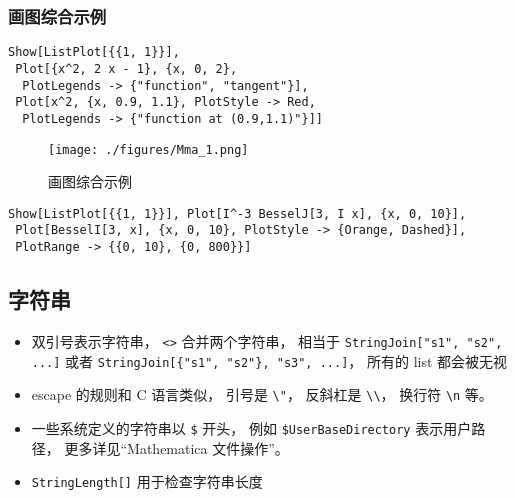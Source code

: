 \subsubsection{画图综合示例}
\begin{lstlisting}[language=mma]
Show[ListPlot[{{1, 1}}],
 Plot[{x^2, 2 x - 1}, {x, 0, 2},
  PlotLegends -> {"function", "tangent"}],
 Plot[x^2, {x, 0.9, 1.1}, PlotStyle -> Red, 
  PlotLegends -> {"function at (0.9,1.1)"}]]
\end{lstlisting}
\begin{figure}[ht]
\centering
\texttt{[image: ./figures/Mma\_1.png]}
\caption{画图综合示例} \label{Mma_fig1}
\end{figure}

\begin{lstlisting}[language=mma]
Show[ListPlot[{{1, 1}}], Plot[I^-3 BesselJ[3, I x], {x, 0, 10}], 
 Plot[BesselI[3, x], {x, 0, 10}, PlotStyle -> {Orange, Dashed}], 
 PlotRange -> {{0, 10}, {0, 800}}]
\end{lstlisting}

\subsection{字符串}
\begin{itemize}
\item 双引号表示字符串， \verb|<>| 合并两个字符串， 相当于 \verb|StringJoin["s1", "s2", ...]| 或者 \verb|StringJoin[{"s1", "s2"}, "s3", ...]|， 所有的 list 都会被无视
\item escape 的规则和 C 语言类似， 引号是 \verb|\"|， 反斜杠是 \verb|\\|， 换行符 \verb|\n| 等。
\item 一些系统定义的字符串以 \verb|$| 开头， 例如 \verb|$UserBaseDirectory| 表示用户路径， 更多详见“Mathematica 文件操作”。
\item \verb|StringLength[]| 用于检查字符串长度
\end{itemize}

